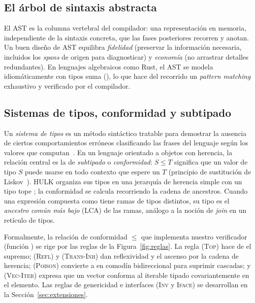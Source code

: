\documentclass[14pts,runningheads,a4paper]{llncs}
\newcommand{\code}[1]{\texttt{\detokenize{#1}}}
\begin{document}
\subsection{El \'arbol de sintaxis abstracta}

El AST es la columna vertebral del compilador: una representaci\'on en memoria,
independiente de la sintaxis concreta, que las fases posteriores recorren y anotan.
Un buen dise\~no de AST equilibra \emph{fidelidad} (preservar la informaci\'on
necesaria, incluidos los \emph{spans} de origen para diagnosticar) y
\emph{econom\'ia} (no arrastrar detalles redundantes). En lenguajes algebraicos como
Rust, el AST se modela idiom\'aticamente con tipos suma (\code{enum}), lo que hace
del recorrido un \emph{pattern matching} exhaustivo y verificado por el compilador.

\subsection{Sistemas de tipos, conformidad y subtipado}

Un \emph{sistema de tipos} es un m\'etodo sint\'actico tratable para demostrar la
ausencia de ciertos comportamientos err\'oneos clasificando las frases del lenguaje
seg\'un los valores que computan~\cite{pierce2002types}. En un lenguaje orientado a
objetos con herencia, la relaci\'on central es la de \emph{subtipado} o
\emph{conformidad}: $S \leq T$ significa que un valor de tipo $S$ puede usarse en
todo contexto que espere un $T$ (principio de sustituci\'on de
Liskov~\cite{liskov1994subtyping}). HULK organiza sus tipos en una jerarqu\'ia de
herencia simple con un tipo tope \code{Object}; la conformidad se calcula
recorriendo la cadena de ancestros. Cuando una expresi\'on compuesta como \code{if}
tiene ramas de tipos distintos, su tipo es el \emph{ancestro com\'un m\'as bajo} (LCA)
de las ramas, an\'alogo a la noci\'on de \emph{join} en un ret\'iculo de tipos.

Formalmente, la relaci\'on de conformidad $\leq$ que implementa nuestro verificador
(funci\'on \code{conforms}) se rige por las reglas de la
Figura~\ref{fig:reglas}. La regla \textsc{(Top)} hace de \code{Object} el supremo;
\textsc{(Refl)} y \textsc{(Trans-Inh)} dan reflexividad y el ascenso por la cadena
de herencia; \textsc{(Poison)} convierte a \code{Type::Error} en comod\'in
bidireccional para suprimir cascadas; y \textsc{(Vec-Iter)} expresa que un vector
conforma al iterable tipado covariantemente en el elemento. Las reglas de genericidad
e interfaces (\textsc{Inv} y \textsc{Iface}) se desarrollan en la
Secci\'on~\ref{sec:extensiones}.
\end{document}
